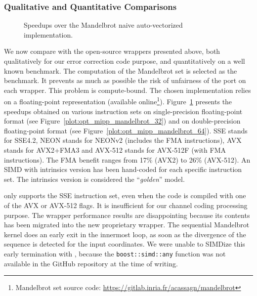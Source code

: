 \subsubsection{Qualitative and Quantitative Comparisons}

\begin{figure}[htp]
  \centering
  \quad
  \caption{Speedups over the Mandelbrot naive auto-vectorized implementation.}
  \label{plot:opt_mipp_mandelbrot}
\end{figure}

We now compare \MIPP with the open-source wrappers presented above, both
qualitatively for our error correction code purpose, and quantitatively on a
well known benchmark. The computation of the Mandelbrot set is selected as the
benchmark. It prevents as much as possible the risk of unfairness of the port on
each wrapper. This problem is compute-bound. The chosen implementation relies on
a floating-point representation (available online\footnote{Mandelbrot set source
code: \url{https://gitlab.inria.fr/acassagn/mandelbrot}}).
Figure~\ref{plot:opt_mipp_mandelbrot} presents the speedups obtained on various
instruction sets on single-precision floating-point format (see
Figure~\ref{plot:opt_mipp_mandelbrot_32}) and on double-precision floating-point
format (see Figure~\ref{plot:opt_mipp_mandelbrot_64}). SSE stands for SSE4.2,
NEON stands for NEONv2 (includes the FMA instructions), AVX stands for AVX2+FMA3
and AVX-512 stands for AVX-512F (with FMA instructions). The FMA benefit ranges
from 17\% (AVX2) to 26\% (AVX-512). An SIMD with intrinsics version has been
hand-coded for each specific instruction set. The intrinsics version is
considered the ``\emph{golden}'' model.

\textbf{\BoostSIMD} only supports the SSE instruction set, even when the code is
compiled with one of the AVX or AVX-512 flags. It is insufficient for our
channel coding processing purpose. The \BoostSIMD wrapper performance results
are disappointing because its contents has been migrated into the new
proprietary \bSIMD wrapper. The sequential Mandelbrot kernel does an early exit
in the innermost loop, as soon as the divergence of the sequence is detected for
the input coordinates. We were unable to SIMDize this early termination with
\BoostSIMD, because the \verb|boost::simd::any| function was not available in
the GitHub repository at the time of writing.

